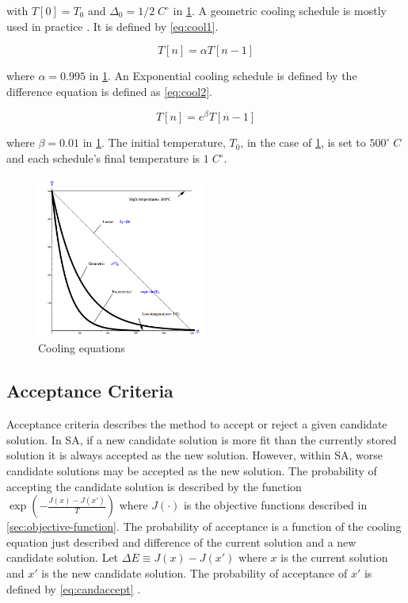 \documentclass[11pt,a4paper,final]{article}
\newcommand{\Tau}{T}                        %
\begin{document}
with \(\Tau[0] = \Tau_0\) and \(\Delta_0 = 1/2\; C^\circ\) in \ref{fig:cool}. A geometric cooling schedule is mostly used in practice
\cite{keller-2019-multi-objec}. It is defined by \ref{eq:cool1}.

\begin{equation}
\label{eq:cool1}
\Tau[n] = \alpha \Tau[n-1]
\end{equation}

where \(\alpha = 0.995\) in \ref{fig:cool}. An Exponential cooling schedule is defined by the difference equation is defined as
\ref{eq:cool2}.

\begin{equation}
\label{eq:cool2}
\Tau[n] = e^{\beta}\Tau[n-1]
\end{equation}

where \(\beta = 0.01\) in \ref{fig:cool}. The initial temperature, \(T_0\), in the case of \ref{fig:cool}, is set to \(500^\circ\; C\) and
each schedule's final temperature is \(1\; C^\circ\).

\begin{figure}[htbp]
\centering
\includegraphics[width=0.5\textwidth]{sections/img/cool-func.jpg}
\caption{\label{fig:cool}Cooling equations}
\end{figure}

\subsection{Acceptance Criteria}
\label{sec:acceptance}
Acceptance criteria describes the method to accept or reject a given candidate solution. In SA, if a new candidate
solution is more fit than the currently stored solution it is always accepted as the new solution. However, within SA,
worse candidate solutions may be accepted as the new solution. The probability of accepting the candidate solution is
described by the function \(\exp(-\frac{J(x) - J(x')}{\Tau})\) where \(J(\cdot)\) is the objective functions described in
\ref{sec:objective-function}. The probability of acceptance is a function of the cooling equation just described and
difference of the current solution and a new candidate solution. Let \(\Delta E \equiv J(x) - J(x')\) where \(x\) is the current
solution and \(x'\) is the new candidate solution. The probability of acceptance of \(x'\) is defined by \ref{eq:candaccept}
\cite{keller-2019-multi-objec}.
\end{document}
